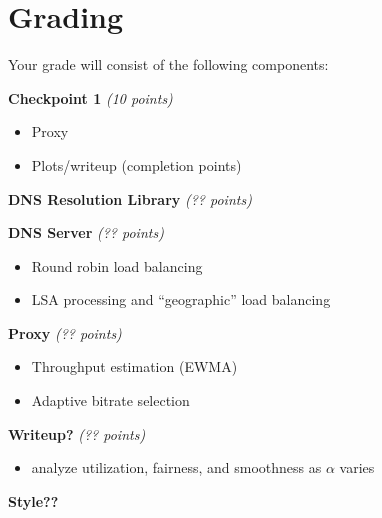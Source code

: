 \documentclass{article}
\begin{document}
\section{Grading}

Your grade will consist of the following components:

\smallskip \noindent \textbf{Checkpoint 1} \textit{(10 points)}
\begin{itemize}
	\item Proxy
	\item Plots/writeup (completion points)
\end{itemize}

\smallskip \noindent \textbf{DNS Resolution Library} \textit{(?? points)}

\smallskip \noindent \textbf{DNS Server} \textit{(?? points)}
\begin{itemize}
	\item Round robin load balancing
	\item LSA processing and ``geographic'' load balancing
\end{itemize}

\smallskip \noindent \textbf{Proxy} \textit{(?? points)}
\begin{itemize}
	\item Throughput estimation (EWMA)
	\item Adaptive bitrate selection
\end{itemize}

\smallskip \noindent \textbf{Writeup?} \textit{(?? points)}
\begin{itemize}
	\item analyze utilization, fairness, and smoothness as $\alpha$ varies
\end{itemize}

\smallskip \noindent \textbf{Style??}
\end{document}
